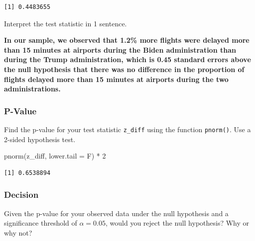 \documentclass[
  letterpaper,
  DIV=11,
  numbers=noendperiod]{scrartcl}
\newenvironment{Shaded}{\begin{snugshade}}{\end{snugshade}}
\newcommand{\AttributeTok}[1]{\textcolor[rgb]{0.40,0.45,0.13}{#1}}
\newcommand{\DecValTok}[1]{\textcolor[rgb]{0.68,0.00,0.00}{#1}}
\newcommand{\FunctionTok}[1]{\textcolor[rgb]{0.28,0.35,0.67}{#1}}
\newcommand{\NormalTok}[1]{\textcolor[rgb]{0.00,0.23,0.31}{#1}}
\newcommand{\SpecialCharTok}[1]{\textcolor[rgb]{0.37,0.37,0.37}{#1}}
\begin{document}
\begin{verbatim}
[1] 0.4483655
\end{verbatim}

Interpret the test statistic in 1 sentence.

\begin{tcolorbox}[enhanced jigsaw, toprule=.15mm, breakable, leftrule=.75mm, bottomrule=.15mm, rightrule=.15mm, colback=white, opacityback=0, colframe=quarto-callout-warning-color-frame, left=2mm, arc=.35mm]

\textbf{In our sample, we observed that 1.2\% more flights were delayed
more than 15 minutes at airports during the Biden administration than
during the Trump administration, which is 0.45 standard errors above the
null hypothesis that there was no difference in the proportion of
flights delayed more than 15 minutes at airports during the two
administrations.}

\end{tcolorbox}

\subsubsection{P-Value}\label{p-value}

Find the p-value for your test statistic \texttt{z\_diff} using the
function \texttt{pnorm()}. Use a 2-sided hypothesis test.

\begin{Shaded}
\begin{Highlighting}[]
\FunctionTok{pnorm}\NormalTok{(z\_diff, }\AttributeTok{lower.tail =}\NormalTok{ F) }\SpecialCharTok{*} \DecValTok{2}
\end{Highlighting}
\end{Shaded}

\begin{verbatim}
[1] 0.6538894
\end{verbatim}

\subsubsection{Decision}\label{decision}

Given the p-value for your observed data under the null hypothesis and a
significance threshold of \(\alpha=0.05\), would you reject the null
hypothesis? Why or why not?
\end{document}
